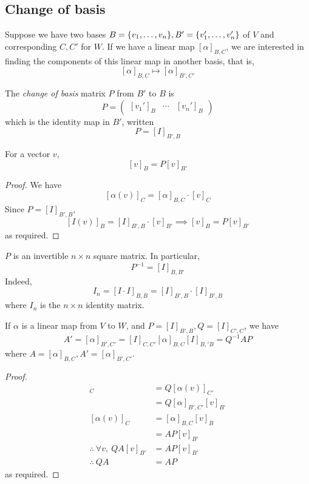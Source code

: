\subsection{Change of basis}
Suppose we have two bases \( B = \qty{v_1, \dots, v_n}, B' = \qty{v_1', \dots, v_n'} \) of \( V \) and corresponding \( C, C' \) for \( W \).
If we have a linear map \( [\alpha]_{B,C} \), we are interested in finding the components of this linear map in another basis, that is,
\[
	[\alpha]_{B,C} \mapsto [\alpha]_{B',C'}
\]
\begin{definition}
	The \textit{change of basis} matrix \( P \) from \( B' \) to \( B \) is
	\[
		P = \begin{pmatrix}
			[v_1']_B & \cdots & [v_n']_B
		\end{pmatrix}
	\]
	which is the identity map in \( B' \), written
	\[
		P = [I]_{B', B}
	\]
\end{definition}
\begin{lemma}
	For a vector \( v \),
	\[
		[v]_B = P [v]_{B'}
	\]
\end{lemma}
\begin{proof}
	We have
	\[
		[\alpha(v)]_C = [\alpha]_{B,C} \cdot [v]_C
	\]
	Since \( P = [I]_{B', B} \),
	\[
		[I(v)]_B = [I]_{B', B} \cdot [v]_{B'} \implies [v]_B = P[v]_{B'}
	\]
	as required.
\end{proof}
\begin{remark}
	\( P \) is an invertible \( n \times n \) square matrix.
	In particular,
	\[
		P^{-1} = [I]_{B,B'}
	\]
	Indeed,
	\[
		I_n = [I \cdot I]_{B,B} = [I]_{B',B} \cdot [I]_{B',B}
	\]
	where \( I_n \) is the \( n \times n \) identity matrix.
\end{remark}
\begin{proposition}
	If \( \alpha \) is a linear map from \( V \) to \( W \), and \( P = [I]_{B',B}, Q = [I]_{C',C} \), we have
	\[
		A' = [\alpha]_{B',C'} = [I]_{C,C'}[\alpha]_{B,C}[I]_{B,'B} = Q^{-1}AP
	\]
	where \( A = [\alpha]_{B,C}, A' = [\alpha]_{B',C'} \).
\end{proposition}
\begin{proof}
	\begin{align*}
		[\alpha(v)]_C                     & = Q [\alpha(v)]_{C'}          \\
		                                  & = Q [\alpha]_{B',C'} [v]_{B'} \\
		[\alpha(v)]_C                     & = [\alpha]_{B,C} [v]_B        \\
		                                  & = AP[v]_{B'}                  \\
		\therefore\ \forall v,\ QA[v]_{B'} & = AP[v]_{B'}                  \\
		\therefore\ QA                     & = AP
	\end{align*}
	as required.
\end{proof}

